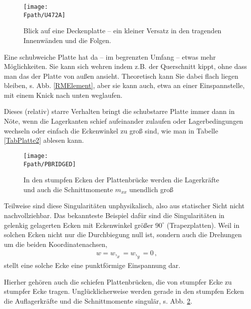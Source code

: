 \begin{figure}
\centering
\texttt{[image: \\Fpath/U472A]}
\caption{Blick auf eine Deckenplatte -- ein kleiner Versatz in den tragenden Innenw\"{a}nden und die Folgen.}
\label{U472}%
\end{figure}%

Eine schubweiche Platte hat da -- im begrenzten Umfang -- etwas mehr M\"{o}glichkeiten. Sie kann sich wehren indem z.B. der Querschnitt kippt, ohne dass man das der Platte von au{\ss}en ansieht. Theoretisch kann Sie dabei flach liegen bleiben, s. Abb. \ref{RMElement}, aber sie kann auch, etwa an einer Einspannstelle, mit einem Knick nach unten weglaufen.

Dieses (relativ) starre Verhalten bringt die schubstarre Platte immer dann in N\"{o}te, wenn die Lagerkanten schief aufeinander zulaufen oder Lagerbedingungen wechseln oder einfach die Eckenwinkel zu gro{\ss} sind, wie man in Tabelle \ref{TabPlatte2} ablesen kann.
\begin{figure}[tbp]
\centering
\if {} \sidecaption \fi
\texttt{[image: \\Fpath/PBRIDGED]}
\caption{In den stumpfen Ecken der Plattenbr\"{u}cke werden die Lagerkr\"{a}fte und auch die
Schnittmomente $m_{xx}$ unendlich gro{\ss}} \label{PBridge}
\end{figure}%

Teilweise sind diese Singularit\"{a}ten unphysikalisch, also aus statischer Sicht nicht nachvollziehbar. Das bekannteste Beispiel daf\"{u}r sind die Singularit\"{a}ten in gelenkig gelagerten Ecken mit Eckenwinkel gr\"{o}{\ss}er $90^\circ$ (Trapezplatten). Weil in solchen Ecken nicht nur die Durchbiegung null ist, sondern auch die Drehungen um die beiden Koordinatenachsen,
\begin{align}
w = w,_x = w,_y = 0\,,
\end{align}
stellt eine solche Ecke eine punktf\"{o}rmige Einspannung dar.

Hierher geh\"{o}ren auch die schiefen Plattenbr\"{u}cken, die von stumpfer Ecke zu stumpfer Ecke tragen. Ungl\"{u}cklicherweise werden gerade in den stumpfen Ecken die Auflagerkr\"{a}fte und die Schnittmomente singul\"{a}r, s. Abb. \ref{PBridge}.

